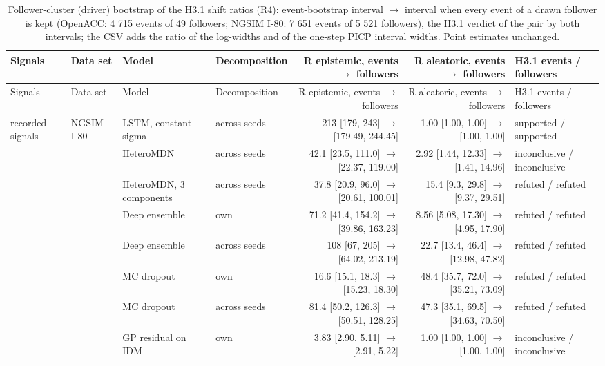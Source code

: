 \begin{longtable}{llllrrl}
\caption{Follower-cluster (driver) bootstrap of the H3.1 shift ratios (R4): event-bootstrap interval $\rightarrow$ interval when every event of a drawn follower is kept (OpenACC: 4 715 events of 49 followers; NGSIM I-80: 7 651 events of 5 521 followers), the H3.1 verdict of the pair by both intervals; the CSV adds the ratio of the log-widths and of the one-step PICP interval widths. Point estimates unchanged.}\label{tab:t2-h31-follower-clusters} \\
\toprule
Signals & Data set & Model & Decomposition & R epistemic, events $\rightarrow$ followers & R aleatoric, events $\rightarrow$ followers & H3.1 events / followers \\
\midrule
\endfirsthead
\toprule
Signals & Data set & Model & Decomposition & R epistemic, events $\rightarrow$ followers & R aleatoric, events $\rightarrow$ followers & H3.1 events / followers \\
\midrule
\endhead
\bottomrule
\endlastfoot
recorded signals & NGSIM I-80 & LSTM, constant sigma & across seeds & 213 [179, 243] $\rightarrow$ [179.49, 244.45] & 1.00 [1.00, 1.00] $\rightarrow$ [1.00, 1.00] & supported / supported \\
 &  & HeteroMDN & across seeds & 42.1 [23.5, 111.0] $\rightarrow$ [22.37, 119.00] & 2.92 [1.44, 12.33] $\rightarrow$ [1.41, 14.96] & inconclusive / inconclusive \\
 &  & HeteroMDN, 3 components & across seeds & 37.8 [20.9, 96.0] $\rightarrow$ [20.61, 100.01] & 15.4 [9.3, 29.8] $\rightarrow$ [9.37, 29.51] & refuted / refuted \\
 &  & Deep ensemble & own & 71.2 [41.4, 154.2] $\rightarrow$ [39.86, 163.23] & 8.56 [5.08, 17.30] $\rightarrow$ [4.95, 17.90] & refuted / refuted \\
 &  & Deep ensemble & across seeds & 108 [67, 205] $\rightarrow$ [64.02, 213.19] & 22.7 [13.4, 46.4] $\rightarrow$ [12.98, 47.82] & refuted / refuted \\
 &  & MC dropout & own & 16.6 [15.1, 18.3] $\rightarrow$ [15.23, 18.30] & 48.4 [35.7, 72.0] $\rightarrow$ [35.21, 73.09] & refuted / refuted \\
 &  & MC dropout & across seeds & 81.4 [50.2, 126.3] $\rightarrow$ [50.51, 128.25] & 47.3 [35.1, 69.5] $\rightarrow$ [34.63, 70.50] & refuted / refuted \\
 &  & GP residual on IDM & own & 3.83 [2.90, 5.11] $\rightarrow$ [2.91, 5.22] & 1.00 [1.00, 1.00] $\rightarrow$ [1.00, 1.00] & inconclusive / inconclusive \\

\end{longtable}
